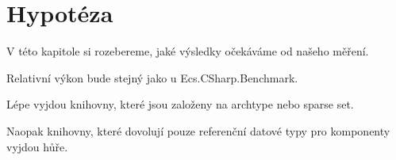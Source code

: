 \chapter{Hypotéza}

V této kapitole si rozebereme, jaké výsledky očekáváme od našeho měření.

Relativní výkon bude stejný jako u Ecs.CSharp.Benchmark.

Lépe vyjdou knihovny, které jsou založeny na archtype nebo sparse set.

Naopak knihovny, které dovolují pouze referenční datové typy pro komponenty vyjdou hůře.

